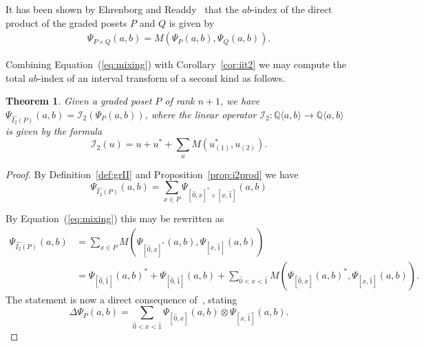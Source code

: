 \documentclass[reqno,12pt]{amsart}
\numberwithin{equation}{section}
\newtheorem{theorem}{Theorem}[section]
\newcommand{\0}{\widehat{0}}
\newcommand{\1}{\widehat{1}}
\newcommand{\2}{\widehat{2}}
\newcommand{\grII}{\widehat{I_2}}
\newcommand{\IIab}{{\mathcal I}_2}
\begin{document}
It has been shown by Ehrenborg and
Readdy~\cite[Theorem 9.2]{Ehrenborg-Readdy-cop} that the $ab$-index of
the direct product of the graded posets $P$ and $Q$ is given by 
\begin{align}
  \Psi_{P\times Q}(a,b)=M(\Psi_P(a,b),\Psi_Q(a,b)).
\label{eq:mixing}  
\end{align}

Combining Equation~(\ref{eq:mixing}) with Corollary~\ref{cor:iit2} we may
compute the total $ab$-index of an interval transform of a
second kind as follows. 
\begin{theorem}
\label{thm:Jojicab2}  
Given a graded poset $P$ of rank $n+1$, we have
$\Psi_{\grII(P)}(a,b)=\IIab(\Psi_{P}(a,b))$, where the linear operator
$\IIab: {\mathbb Q}\langle a,b\rangle \rightarrow {\mathbb Q}\langle a,b\rangle$
is given by the formula
$$
\IIab(u)=u+u^*+\sum_u M(u_{(1)}^*,u_{(2)}).
$$
\end{theorem}  
\begin{proof}
By Definition~\ref{def:grII} and Proposition~\ref{prop:i2prod} we have
$$
\Psi_{\grII(P)}(a,b)=\sum_{x\in P} \Psi_{[\0,x]^*\times [x,\1]}(a,b)
$$

By Equation~(\ref{eq:mixing}) this may be rewritten as
\begin{align*}
\Psi_{\grII(P)}(a,b)&=
\sum_{x\in P} M(\Psi_{[\0,x]^*}(a,b),\Psi_{[x,\1]}(a,b))\\
&=
\Psi_{[\0,\1]}(a,b)^*+\Psi_{[\0,\1]}(a,b)+\sum_{\0<x<\1}
M(\Psi_{[\0,x]}(a,b)^*,\Psi_{[x,\1]}(a,b)). 
\end{align*}
The statement is now a direct consequence of~\cite[Equation
  (3.1)]{Ehrenborg-Readdy-cop}, stating
$$
\Delta{\Psi_{P}}(a,b)=\sum_{\0<x<\1} \Psi_{[\0,x]}(a,b)\otimes
  \Psi_{[x,\1]}(a,b).  
$$
\end{proof}  
\end{document}
